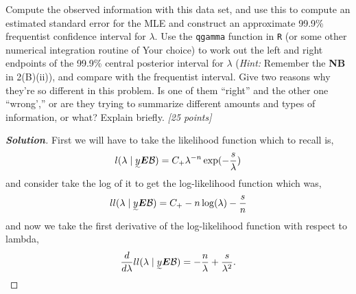 \documentclass[12pt]{article}
\newenvironment{solution}{\begin{proof}[\textbf{\textit{Solution}}] }{\end{proof}}
\begin{document}
\begin{itemize}
\begin{itemize}
\begin{itemize}
Compute the observed information with this data set, and use this to compute an estimated standard error for the MLE and construct an approximate 99.9\% frequentist confidence interval for $\lambda$. Use the \texttt{qgamma} function in \texttt{R} (or some other numerical integration routine of Your choice) to work out the left and right endpoints of the 99.9\% central posterior interval for $\lambda$ (\textit{Hint:} Remember the \textbf{NB} in 2(B)(ii)), and compare with the frequentist interval. Give two reasons why they're so different in this problem. Is one of them ``right'' and the other one ``wrong','' or are they trying to summarize different amounts and types of information, or what? Explain briefly. \textit{[25 points]}
\begin{tcolorbox}[breakable]
    \begin{solution}
        First we will have to take the likelihood function which to recall is,
        \[l(\lambda \mid \undertilde{y}\bm{E}\mathcal{B}) = C_+ \lambda^{-n}\exp(-\frac{s}{\lambda})\]
        and consider take the log of it to get the log-likelihood function which was,
        \[ll(\lambda\mid \undertilde{y}\bm{E}\mathcal{B}) = C_+ - n\log(\lambda) - \dfrac{s}{n}\]
        and now we take the first derivative of the log-likelihood function with respect to lambda,
        \[\dfrac{d}{d\lambda}ll(\lambda\mid \undertilde{y}\bm{E}\mathcal{B}) = -\dfrac{n}{\lambda} + \dfrac{s}{\lambda^{2}}.\]
    

\end{solution}
\end{tcolorbox}
\end{itemize}
\end{itemize}
\end{itemize}
\end{document}
